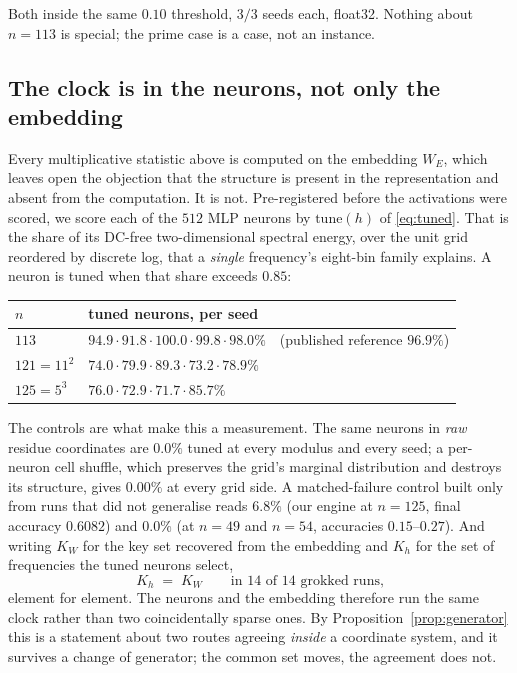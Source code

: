 Both inside the same $0.10$ threshold, $3/3$ seeds each, float32. Nothing about $n = 113$ is
special; the prime case is a case, not an instance.

\subsection{The clock is in the neurons, not only the embedding}
\label{sec:clock-neurons}

Every multiplicative statistic above is computed on the embedding $W_{E}$, which leaves open
the objection that the structure is present in the representation and absent from the
computation. It is not. Pre-registered before the activations were scored, we score each of
the $512$ MLP neurons by $\mathrm{tune}(h)$ of \eqref{eq:tuned}. That is the share of its
DC-free two-dimensional spectral energy, over the unit grid reordered by discrete log, that a
\emph{single} frequency's eight-bin family explains. A neuron is tuned when that share exceeds
$0.85$:

\begin{center}
\begin{tabular}{lll}
  \toprule
  $n$ & tuned neurons, per seed & \\
  \midrule
  $113$ & $94.9 \cdot 91.8 \cdot 100.0 \cdot 99.8 \cdot 98.0\%$ & (published reference $96.9\%$) \\
  $121 = 11^{2}$ & $74.0 \cdot 79.9 \cdot 89.3 \cdot 73.2 \cdot 78.9\%$ & \\
  $125 = 5^{3}$ & $76.0 \cdot 72.9 \cdot 71.7 \cdot 85.7\%$ & \\
  \bottomrule
\end{tabular}
\end{center}

The controls are what make this a measurement. The same neurons in \emph{raw} residue
coordinates are $0.0\%$ tuned at every modulus and every seed; a per-neuron cell shuffle,
which preserves the grid's marginal distribution and destroys its structure, gives $0.00\%$ at
every grid side. A matched-failure control built only from runs that did not generalise reads
$6.8\%$ (our engine at $n = 125$, final accuracy $0.6082$) and $0.0\%$ (at $n = 49$ and
$n = 54$, accuracies $0.15$--$0.27$). And writing $K_{W}$ for the key set recovered from the embedding and $K_{h}$ for the set of
frequencies the tuned neurons select,
\begin{equation}
  \label{eq:keyagree}
  K_{h} \;=\; K_{W} \qquad \text{in } 14 \text{ of } 14 \text{ grokked runs,}
\end{equation}
element for element. The neurons and the embedding therefore run the same clock rather than
two coincidentally sparse ones. By Proposition~\ref{prop:generator} this is a statement
about two routes agreeing \emph{inside} a coordinate system, and it survives a change of
generator; the common set moves, the agreement does not.

